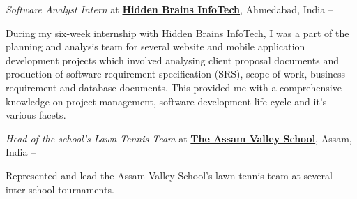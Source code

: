 \documentclass[a4paper,10pt,oneside]{article}
\begin{document}
\begin{body}
\BigEntryGapNoBreak
\textit{Software Analyst Intern} at
\href{http://www.hiddenbrains.com/}
{\textbf{Hidden Brains InfoTech}},
Ahmedabad, India
\hfill
{} --
\EntryGapNoBreak
\begin{detailwithoutsubheading}
\BulletItem
During my six-week internship with Hidden Brains InfoTech, I was a part of the planning and analysis team for several website and mobile application development projects which involved analysing client proposal documents and production of software requirement specification (SRS), scope of work, business requirement and database documents. This provided me with a comprehensive knowledge on project management, software development life cycle and it’s various facets.
\end{detailwithoutsubheading}

\BigEntryGapNoBreak
\textit{Head of the school's Lawn Tennis Team} at \href{http://www.assamvalleyschool.com}{\textbf{The Assam Valley School}},
Assam, India
\hfill
{} --
\begin{detailwithoutsubheading}
\BulletItem
Represented and lead the Assam Valley School's lawn tennis team at several inter-school tournaments.
\end{detailwithoutsubheading}
\vspace{-5pt}
\hline


\end{body}
\end{document}
